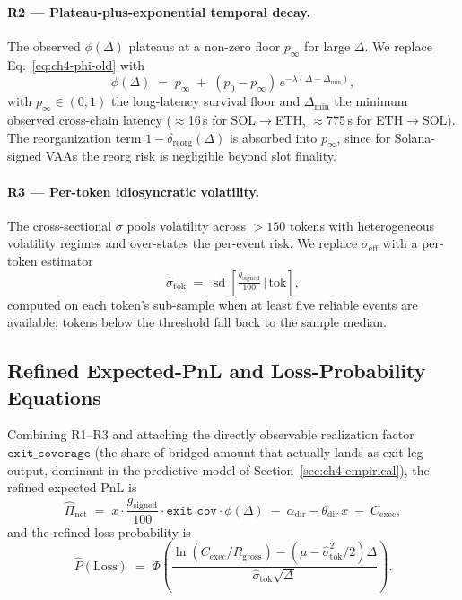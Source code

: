 \documentclass[11pt,a4paper]{article}
\newcommand{\SolEth}{SOL$\to$ETH}
\newcommand{\EthSol}{ETH$\to$SOL}
\newcommand{\gsigned}{g_{\text{signed}}}
\newcommand{\Cexec}{C_{\text{exec}}}
\newcommand{\Rgross}{R_{\text{gross}}}
\begin{document}
\paragraph{R2 --- Plateau-plus-exponential temporal decay.} The observed
$\phi(\Delta)$ plateaus at a non-zero floor $p_{\infty}$ for large
$\Delta$. We replace Eq.~\eqref{eq:ch4-phi-old} with
\begin{equation}
\label{eq:ch4-phi-new}
    \phi(\Delta) \;=\; p_{\infty} \;+\;
        (p_{0} - p_{\infty})\,e^{-\lambda(\Delta-\Delta_{\min})},
\end{equation}
with $p_{\infty} \in (0,1)$ the long-latency survival floor and
$\Delta_{\min}$ the minimum observed cross-chain latency ($\approx$16\,s
for \SolEth, $\approx$775\,s for \EthSol). The reorganization term
$1-\delta_{\text{reorg}}(\Delta)$ is absorbed into $p_{\infty}$, since for
Solana-signed VAAs the reorg risk is negligible beyond slot finality.

\paragraph{R3 --- Per-token idiosyncratic volatility.} The cross-sectional
$\sigma$ pools volatility across $>\!150$ tokens with heterogeneous
volatility regimes and over-states the per-event risk. We replace
$\sigma_{\text{eff}}$ with a per-token estimator
\begin{equation}
\label{eq:ch4-sigma-token}
    \hat\sigma_{\text{tok}} \;=\;
    \operatorname{sd}\!\left[\tfrac{g_{\text{signed}}}{100}\,
    \Big|\,\text{tok}\right],
\end{equation}
computed on each token's sub-sample when at least five reliable events are
available; tokens below the threshold fall back to the sample median.

\subsection{Refined Expected-PnL and Loss-Probability Equations}

Combining R1--R3 and attaching the directly observable realization factor
$\texttt{exit\_coverage}$ (the share of bridged amount that actually lands
as exit-leg output, dominant in the predictive model of
Section~\ref{sec:ch4-empirical}), the refined expected PnL is
\begin{equation}
\label{eq:ch4-pi-hat}
    \widehat{\Pi}_{\text{net}} \;=\;
    x\cdot\frac{\gsigned}{100}
    \cdot\texttt{exit\_cov}\cdot\phi(\Delta)
    \;-\;\alpha_{\text{dir}} - \theta_{\text{dir}}\,x
    \;-\;\Cexec,
\end{equation}
and the refined loss probability is
\begin{equation}
\label{eq:ch4-ploss-new}
    \widehat{P}(\text{Loss}) \;=\;
    \Phi\!\left(\frac{\ln(\Cexec/\Rgross) -
        (\mu - \hat\sigma_{\text{tok}}^{2}/2)\Delta}
        {\hat\sigma_{\text{tok}}\sqrt{\Delta}}\right).
\end{equation}
\end{document}

